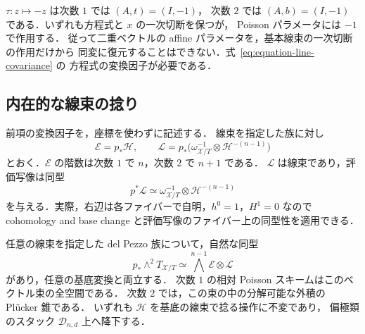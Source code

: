 \begin{remark}
\label{rem:deck-action}
$\tau:z\mapsto-z$ は次数 $1$ では $(A,t)=(I,-1)$，
次数 $2$ では $(A,b)=(I,-1)$ である．いずれも方程式と $x$ の一次切断を保つが，
Poisson パラメータには $-1$ で作用する．
従って二重ベクトルの affine パラメータを，基本線束の一次切断の作用だけから
同変に復元することはできない．式~\eqref{eq:equation-line-covariance} の
方程式の変換因子が必要である．
\end{remark}

\subsection{内在的な線束の捻り}

前項の変換因子を，座標を使わずに記述する．
線束を指定した族に対し
\begin{equation}
 \mathcal E=p_*\mathcal H,\qquad
 \mathcal L=p_*\bigl(\omega_{\mathcal X/T}^{-1}
                   \otimes\mathcal H^{-(n-1)}\bigr)
 \label{eq:moduli-intrinsic-bundles}
\end{equation}
とおく．$\mathcal E$ の階数は次数 $1$ で $n$，次数 $2$ で $n+1$ である．
$\mathcal L$ は線束であり，評価写像は同型
\[
 p^*\mathcal L\simeq
 \omega_{\mathcal X/T}^{-1}\otimes\mathcal H^{-(n-1)}
\]
を与える．実際，右辺は各ファイバーで自明，$h^0=1$，$H^1=0$ なので
cohomology and base change と評価写像のファイバー上の同型性を適用できる．

\begin{proposition}
\label{prop:intrinsic-bivector-bundle}
任意の線束を指定した del Pezzo 族について，自然な同型
\begin{equation}
 p_*\wedge^2T_{\mathcal X/T}
 \simeq\bigwedge^{n-1}\mathcal E\otimes\mathcal L
 \label{eq:intrinsic-bivector-bundle}
\end{equation}
があり，任意の基底変換と両立する．
次数 $1$ の相対 Poisson スキームはこのベクトル束の全空間である．
次数 $2$ では，この束の中の分解可能な外積の Pl\"ucker 錐である．
いずれも $\mathcal H$ を基底の線束で捻る操作に不変であり，
偏極類のスタック $\mathcal D_{n,d}$ 上へ降下する．
\end{proposition}

